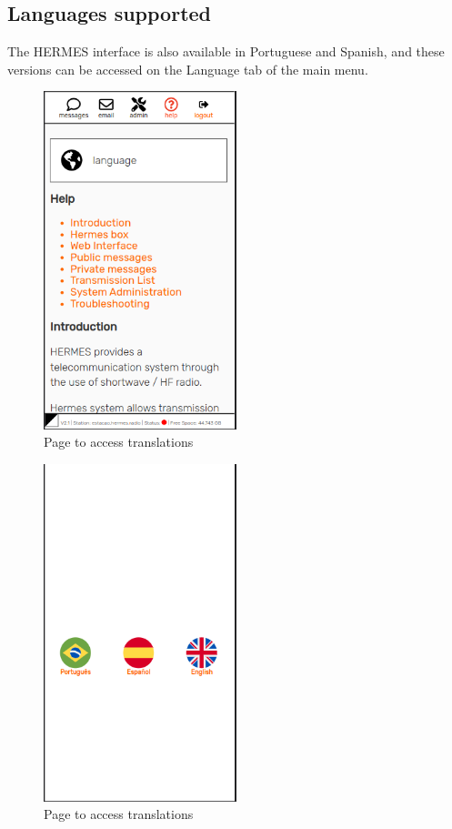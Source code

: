 \documentclass[11pt,a4paper]{article}
\begin{document}
\subsection{Languages supported}
\label{langs}

The HERMES interface is also available in Portuguese and Spanish, and these versions can be accessed on the Language tab of the main menu.

\begin{figure}[H]
    \centering
    \includegraphics[width=0.5\textwidth]{screenshots/frontend/en/languages.png}
    \caption{Page to access translations}
	\vspace{-10pt}
    \label{fig:languages}
\end{figure}

\begin{figure}[H]
    \centering
    \includegraphics[width=0.5\textwidth]{screenshots/frontend/en/languages2.png}
    \caption{Page to access translations}
	\vspace{-10pt}
    \label{fig:languages2}
\end{figure}
\end{document}
